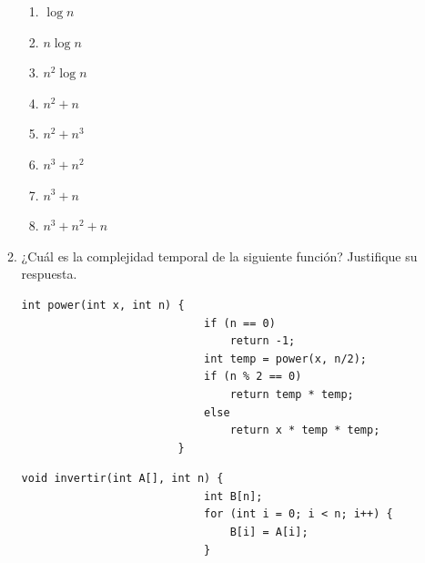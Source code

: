 \documentclass[12pt]{article}
\begin{document}
\begin{titlepage}
\begin{enumerate}
\begin{enumerate}[label*=\arabic*.]
\begin{multicols}{3}
\begin{enumerate}
                    \item $\log n$
                    \item $n \log n$
                    \item $n^2 \log n$
                    \item $n^2 + n$
                    \item $n^2 + n^3$
                    \item $n^3 + n^2$
                    \item $n^3 + n$
                    \item $n^3 + n^2 + n$
                \end{enumerate}
                \end{multicols}
                \item ¿Cuál es la complejidad temporal de la siguiente función? Justifique su respuesta.
                    \begin{lstlisting}[xleftmargin=-14.4em]
                        int power(int x, int n) {
                            if (n == 0)
                                return -1;
                            int temp = power(x, n/2);
                            if (n % 2 == 0)
                                return temp * temp;
                            else
                                return x * temp * temp;
                        }
                    \end{lstlisting}
                    \begin{lstlisting}[xleftmargin=-14.4em]
                        void invertir(int A[], int n) {
                            int B[n];
                            for (int i = 0; i < n; i++) {
                                B[i] = A[i];
                            }


\end{lstlisting}
\end{enumerate}
\end{enumerate}
\end{titlepage}
\end{document}
